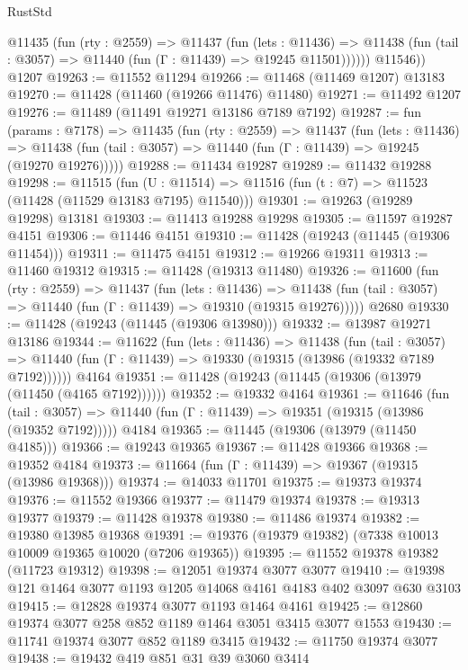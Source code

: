 \begin{lexlean}{RustStd}
\begin{coremodule}
          @11435
            (fun (rty : @2559) =>
            @11437
              (fun (lets : @11436) =>
              @11438 (fun (tail : @3057) => @11440 (fun (Γ : @11439) => @19245 @11501))))))
        @11546))
    @1207
@19263 := @11552 @11294
@19266 := @11468 (@11469 @1207) @13183
@19270 := @11428 (@11460 (@19266 @11476) @11480)
@19271 := @11492 @1207
@19276 := @11489 (@11491 @19271 @13186 @7189 @7192)
@19287 := fun (params : @7178) =>
  @11435
    (fun (rty : @2559) =>
    @11437
      (fun (lets : @11436) =>
      @11438 (fun (tail : @3057) => @11440 (fun (Γ : @11439) => @19245 (@19270 @19276)))))
@19288 := @11434 @19287
@19289 := @11432 @19288
@19298 := @11515
    (fun (U : @11514) => @11516 (fun (t : @7) => @11523 (@11428 (@11529 @13183 @7195) @11540)))
@19301 := @19263 (@19289 @19298) @13181
@19303 := @11413 @19288 @19298
@19305 := @11597 @19287 @4151
@19306 := @11446 @4151
@19310 := @11428 (@19243 (@11445 (@19306 @11454)))
@19311 := @11475 @4151
@19312 := @19266 @19311
@19313 := @11460 @19312
@19315 := @11428 (@19313 @11480)
@19326 := @11600
    (fun (rty : @2559) =>
    @11437
      (fun (lets : @11436) =>
      @11438 (fun (tail : @3057) => @11440 (fun (Γ : @11439) => @19310 (@19315 @19276)))))
    @2680
@19330 := @11428 (@19243 (@11445 (@19306 @13980)))
@19332 := @13987 @19271 @13186
@19344 := @11622
    (fun (lets : @11436) =>
    @11438
      (fun (tail : @3057) =>
      @11440 (fun (Γ : @11439) => @19330 (@19315 (@13986 (@19332 @7189 @7192))))))
    @4164
@19351 := @11428 (@19243 (@11445 (@19306 (@13979 (@11450 (@4165 @7192))))))
@19352 := @19332 @4164
@19361 := @11646
    (fun (tail : @3057) => @11440 (fun (Γ : @11439) => @19351 (@19315 (@13986 (@19352 @7192)))))
    @4184
@19365 := @11445 (@19306 (@13979 (@11450 @4185)))
@19366 := @19243 @19365
@19367 := @11428 @19366
@19368 := @19352 @4184
@19373 := @11664 (fun (Γ : @11439) => @19367 (@19315 (@13986 @19368)))
@19374 := @14033 @11701
@19375 := @19373 @19374
@19376 := @11552 @19366
@19377 := @11479 @19374
@19378 := @19313 @19377
@19379 := @11428 @19378
@19380 := @11486 @19374
@19382 := @19380 @13985 @19368
@19391 := @19376 (@19379 @19382) (@7338 @10013 @10009 @19365 @10020 (@7206 @19365))
@19395 := @11552 @19378 @19382 (@11723 @19312)
@19398 := @12051 @19374 @3077 @3077
@19410 := @19398 @121 @1464 @3077 @1193 @1205 @14068 @4161 @4183 @402 @3097 @630 @3103
@19415 := @12828 @19374 @3077 @1193 @1464 @4161
@19425 := @12860 @19374 @3077 @258 @852 @1189 @1464 @3051 @3415 @3077 @1553
@19430 := @11741 @19374 @3077 @852 @1189 @3415
@19432 := @11750 @19374 @3077
@19438 := @19432 @419 @851 @31 @39 @3060 @3414

\end{coremodule}
\end{lexlean}
